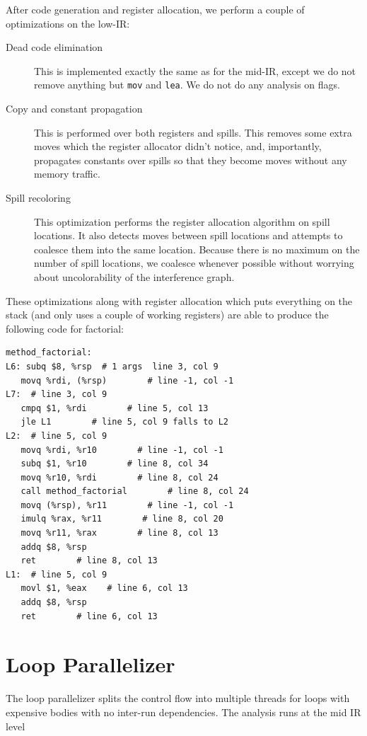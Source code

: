 \documentclass[11pt]{article}
\begin{document}
After code generation and register allocation, we perform a couple of
optimizations on the low-IR:
\begin{description}
\item[Dead code elimination] This is implemented exactly the same as
  for the mid-IR, except we do not remove anything but \texttt{mov}
  and \texttt{lea}.  We do not do any analysis on flags.
\item[Copy and constant propagation] This is performed over both
  registers and spills.  This removes some extra moves which the
  register allocator didn't notice, and, importantly, propagates
  constants over spills so that they become moves without any memory
  traffic.
\item[Spill recoloring] This optimization performs the register
  allocation algorithm on spill locations.  It also detects moves
  between spill locations and attempts to coalesce them into the same
  location.  Because there is no maximum on the number of spill
  locations, we coalesce whenever possible without worrying about
  uncolorability of the interference graph.
\end{description}

These optimizations along with register allocation which puts
everything on the stack (and only uses a couple of working registers)
are able to produce the following code for factorial:
{\footnotesize
\begin{verbatim}
method_factorial:
L6: subq $8, %rsp  # 1 args  line 3, col 9
   movq %rdi, (%rsp)        # line -1, col -1
L7:  # line 3, col 9
   cmpq $1, %rdi        # line 5, col 13
   jle L1        # line 5, col 9 falls to L2
L2:  # line 5, col 9
   movq %rdi, %r10        # line -1, col -1
   subq $1, %r10        # line 8, col 34
   movq %r10, %rdi        # line 8, col 24
   call method_factorial        # line 8, col 24
   movq (%rsp), %r11        # line -1, col -1
   imulq %rax, %r11        # line 8, col 20
   movq %r11, %rax        # line 8, col 13
   addq $8, %rsp
   ret        # line 8, col 13
L1:  # line 5, col 9
   movl $1, %eax    # line 6, col 13
   addq $8, %rsp
   ret        # line 6, col 13
\end{verbatim}
}

\section{Loop Parallelizer}

The loop parallelizer splits the control flow into multiple threads
for loops with expensive bodies with no inter-run dependencies. The
analysis runs at the mid IR level 
\end{document}
